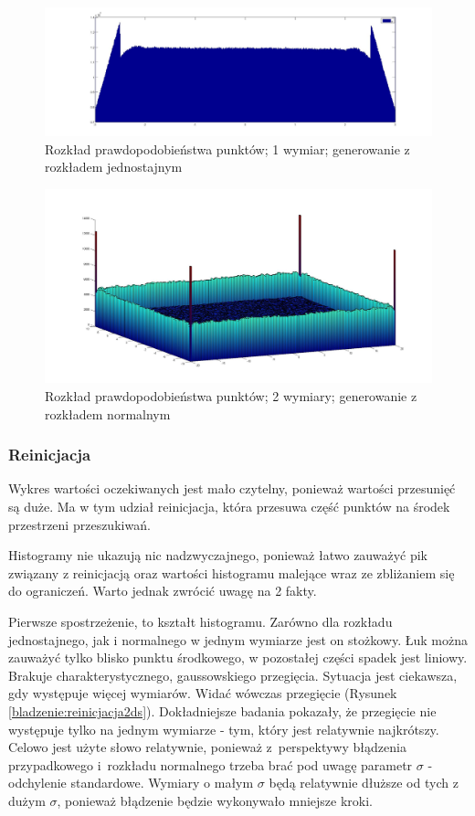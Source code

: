 \documentclass{mini}
\begin{document}
\begin{figure}[H]
\centering
\includegraphics[width=\textwidth]{p_j_100M_1__3_3}
\caption{Rozkład prawdopodobieństwa punktów; 1 wymiar; generowanie z rozkładem jednostajnym}
\label{bladzenie:rzutowanie1dj}
\end{figure}

\begin{figure}[H]
\centering
\includegraphics[width=\textwidth]{p_n_10M_2__20_20__10_10_4_2}
\caption{Rozkład prawdopodobieństwa punktów; 2 wymiary; generowanie z rozkładem normalnym}
\label{bladzenie:rzutowanie2d}
\end{figure}

\subsubsection*{Reinicjacja}
Wykres wartości oczekiwanych jest mało czytelny, ponieważ wartości przesunięć są duże. Ma w tym udział reinicjacja, która przesuwa część punktów na środek przestrzeni przeszukiwań.

Histogramy nie ukazują nic nadzwyczajnego, ponieważ łatwo zauważyć pik związany z reinicjacją oraz wartości histogramu malejące wraz ze zbliżaniem się do ograniczeń. Warto jednak zwrócić uwagę na 2 fakty.

Pierwsze spostrzeżenie, to kształt histogramu. Zarówno dla rozkładu jednostajnego, jak i normalnego w jednym wymiarze jest on stożkowy. Łuk można zauważyć tylko blisko punktu środkowego, w pozostałej części spadek jest liniowy. Brakuje charakterystycznego, gaussowskiego przegięcia. Sytuacja jest ciekawsza, gdy występuje więcej wymiarów. Widać wówczas przegięcie (Rysunek \ref{bladzenie:reinicjacja2ds}). Dokładniejsze badania pokazały, że przegięcie nie występuje tylko na jednym wymiarze - tym, który jest relatywnie najkrótszy. Celowo jest użyte słowo relatywnie, ponieważ z~perspektywy błądzenia przypadkowego i~rozkładu normalnego trzeba brać pod uwagę parametr $\sigma$ - odchylenie standardowe. Wymiary o małym $\sigma$ będą relatywnie dłuższe od tych z dużym $\sigma$, ponieważ błądzenie będzie wykonywało mniejsze kroki.
\end{document}
